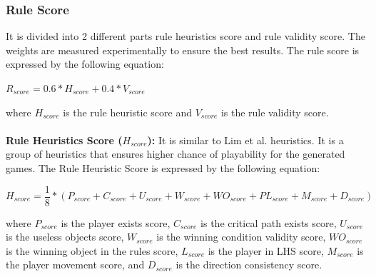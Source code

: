 \subsubsection{Rule Score}
It is divided into 2 different parts rule heuristics score and rule validity score. The weights are measured experimentally to ensure the best results. The rule score is expressed by the following equation:
\begin{center}
$R_{score} = 0.6 * H_{score} + 0.4 * V_{score}$
\end{center}
where $H_{score}$ is the rule heuristic score and $V_{score}$ is the rule validity score.\\\\
\textbf{Rule Heuristics Score ($H_{score}$):} It is similar to Lim et al.\cite{puzzleScriptGeneration} heuristics. It is a group of heuristics that ensures higher chance of playability for the generated games. The Rule Heuristic Score is expressed by the following equation:
\begin{center}
$H_{score} = \dfrac{1}{8} * (P_{score} + C_{score} + U_{score} + W_{score} + WO_{score} + PL_{score} + M_{score} + D_{score})$
\end{center}
where $P_{score}$ is the player exists score, $C_{score}$ is the critical path exists score, $U_{score}$ is the useless objects score, $W_{score}$ is the winning condition validity score, $WO_{score}$ is the winning object in the rules score, $L_{score}$ is the player in LHS score, $M_{score}$ is the player movement score, and $D_{score}$ is the direction consistency score.
